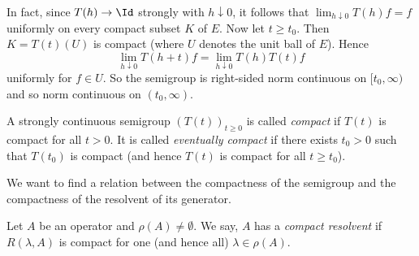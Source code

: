 In fact, since $T(h) \to \Id $ strongly with $h \downarrow 0$, it follows that $\lim_{h \downarrow 0} T(h)f = f$ uniformly on every compact subset $K$ of\/ $E$.
Now let $t \geq t_0$.
Then $K = T(t)(U)$ is compact (where $U$ denotes the unit ball of\/ $E$).
Hence 
%
\[
	\lim \limits_{h \downarrow 0} T(h+t)f = \lim \limits_{h \downarrow 0} T(h)T(t)f 
\]
%
uniformly for $f \in U$.
So the semigroup is right-sided norm continuous on $[t_0,\infty)$ and so norm continuous on $(t_0,\infty)$.

\begin{definition}\label{def:a2-1.22}
A strongly continuous semigroup $(T(t))_{t\geq 0}$ is called \emph{compact} if\/ $T(t)$ is compact for all $t > 0$. It is called \emph{eventually compact} if there exists $t_0 > 0$ such that $T(t_0)$ is compact (and hence $T(t)$ is compact for all $t \geq t_0$).
\end{definition}

We want to find a relation between the compactness of the semigroup and the compactness of the resolvent of its generator.

\begin{definition}\label{def:a2-1.23}

Let $A$ be an operator and $\rho(A) \neq \emptyset$.
We say, $A$ has a \emph{compact resolvent} if\/ $R(\lambda,A)$ is compact for one (and hence all) $\lambda \in \rho(A)$.
\end{definition}

